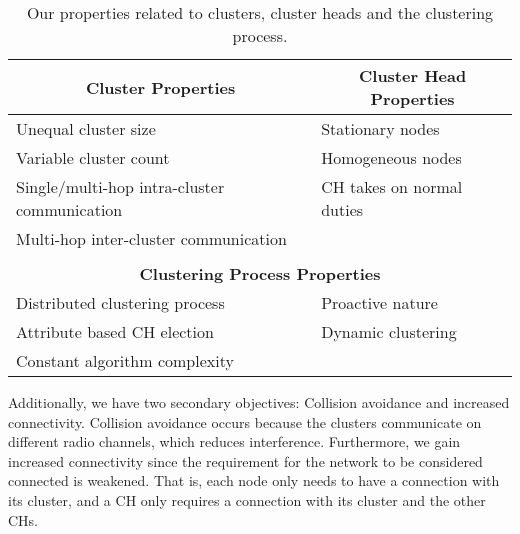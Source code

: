 \begin{table}[bt]
\centering
\caption{Our properties related to clusters, cluster heads and the clustering process.}
\label{table:clustering-design-properties}
\begin{tabular}{ll}
\multicolumn{1}{c}{\textbf{Cluster Properties}}             & \multicolumn{1}{c}{\textbf{Cluster Head Properties}} \\ \hline
\multicolumn{1}{l|}{Unequal cluster size}                   & Stationary nodes                                     \\
\multicolumn{1}{l|}{Variable cluster count}                 & Homogeneous nodes                                    \\
\multicolumn{1}{l|}{Single/multi-hop intra-cluster communication} & CH takes on normal duties                            \\
\multicolumn{1}{l|}{Multi-hop inter-cluster communication}  & \textbf{}                                            \\
                                                            &                                                      \\
\multicolumn{2}{c}{\textbf{Clustering Process Properties}}                                                         \\ \hline
Distributed clustering process                              & Proactive nature                                     \\
Attribute based CH election                                 & Dynamic clustering                                   \\
Constant algorithm complexity                               &                                                     
\end{tabular}
\end{table}

Additionally, we have two secondary objectives: Collision avoidance and increased connectivity. Collision avoidance occurs because the clusters communicate on different radio channels, which reduces interference. Furthermore, we gain increased connectivity since the requirement for the network to be considered connected is weakened. That is, each node only needs to have a connection with its cluster, and a CH only requires a connection with its cluster and the other CHs.


